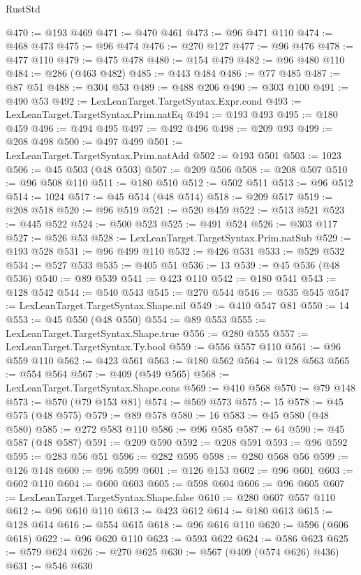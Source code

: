 \begin{lexlean}{RustStd}
\begin{coremodule}
@470 := @193 @469
@471 := @470 @461
@473 := @96 @471 @110
@474 := @468 @473
@475 := @96 @474
@476 := @270 @127
@477 := @96 @476
@478 := @477 @110
@479 := @475 @478
@480 := @154 @479
@482 := @96 @480 @110
@484 := @286 (@463 @482)
@485 := @443 @484
@486 := @77 @485
@487 := @87 @51
@488 := @304 @53
@489 := @488 @206
@490 := @303 @100
@491 := @490 @53
@492 := LexLeanTarget.TargetSyntax.Expr.cond
@493 := LexLeanTarget.TargetSyntax.Prim.natEq
@494 := @193 @493
@495 := @180 @459
@496 := @494 @495
@497 := @492 @496
@498 := @209 @93
@499 := @208 @498
@500 := @497 @499
@501 := LexLeanTarget.TargetSyntax.Prim.natAdd
@502 := @193 @501
@503 := 1023
@506 := @45 @503 (@48 @503)
@507 := @209 @506
@508 := @208 @507
@510 := @96 @508 @110
@511 := @180 @510
@512 := @502 @511
@513 := @96 @512
@514 := 1024
@517 := @45 @514 (@48 @514)
@518 := @209 @517
@519 := @208 @518
@520 := @96 @519
@521 := @520 @459
@522 := @513 @521
@523 := @445 @522
@524 := @500 @523
@525 := @491 @524
@526 := @303 @117
@527 := @526 @53
@528 := LexLeanTarget.TargetSyntax.Prim.natSub
@529 := @193 @528
@531 := @96 @499 @110
@532 := @426 @531
@533 := @529 @532
@534 := @527 @533
@535 := @405 @51
@536 := 13
@539 := @45 @536 (@48 @536)
@540 := @89 @539
@541 := @423 @110
@542 := @180 @541
@543 := @128 @542
@544 := @540 @543
@545 := @270 @544
@546 := @535 @545
@547 := LexLeanTarget.TargetSyntax.Shape.nil
@549 := @410 @547 @81
@550 := 14
@553 := @45 @550 (@48 @550)
@554 := @89 @553
@555 := LexLeanTarget.TargetSyntax.Shape.true
@556 := @280 @555
@557 := LexLeanTarget.TargetSyntax.Ty.bool
@559 := @556 @557 @110
@561 := @96 @559 @110
@562 := @423 @561
@563 := @180 @562
@564 := @128 @563
@565 := @554 @564
@567 := @409 (@549 @565)
@568 := LexLeanTarget.TargetSyntax.Shape.cons
@569 := @410 @568
@570 := @79 @148
@573 := @570 (@79 @153 @81)
@574 := @569 @573
@575 := 15
@578 := @45 @575 (@48 @575)
@579 := @89 @578
@580 := 16
@583 := @45 @580 (@48 @580)
@585 := @272 @583 @110
@586 := @96 @585
@587 := 64
@590 := @45 @587 (@48 @587)
@591 := @209 @590
@592 := @208 @591
@593 := @96 @592
@595 := @283 @56 @51
@596 := @282 @595
@598 := @280 @568 @56
@599 := @126 @148
@600 := @96 @599
@601 := @126 @153
@602 := @96 @601
@603 := @602 @110
@604 := @600 @603
@605 := @598 @604
@606 := @96 @605
@607 := LexLeanTarget.TargetSyntax.Shape.false
@610 := @280 @607 @557 @110
@612 := @96 @610 @110
@613 := @423 @612
@614 := @180 @613
@615 := @128 @614
@616 := @554 @615
@618 := @96 @616 @110
@620 := @596 (@606 @618)
@622 := @96 @620 @110
@623 := @593 @622
@624 := @586 @623
@625 := @579 @624
@626 := @270 @625
@630 := @567 (@409 (@574 @626) @436)
@631 := @546 @630

\end{coremodule}
\end{lexlean}
